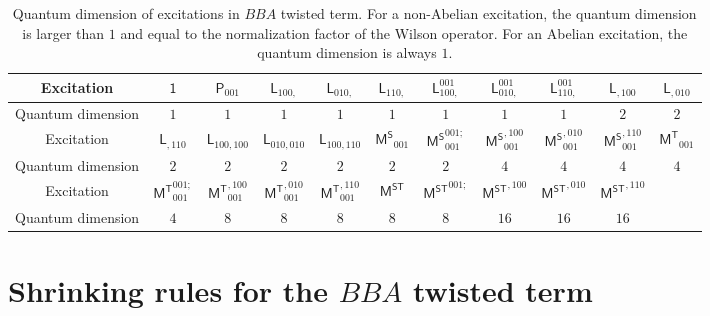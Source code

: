 \documentclass[11pt,nofootinbib,preprint]{revtex4-1}
\begin{document}
\begin{table}
	\caption{\label{table_quantumdBBA}Quantum dimension of excitations in $BBA$ twisted term. For a non-Abelian excitation, the quantum dimension is larger than $1$ and equal to the normalization factor of the Wilson operator. For an Abelian excitation, the quantum dimension is always $1$.  }
	\centering
	\footnotesize
	\begin{tabular*}{\textwidth}{@{\extracolsep{\fill}}ccccccccccc}
		\toprule
		Excitation & $\mathsf{1}$ & $\mathsf{P}_{001}$ & $\mathsf{L}_{100,}$ & $\mathsf{L}_{010,}$ & $\mathsf{L}_{110,}$ & $\mathsf{L}_{100,}^{001}$ & $\mathsf{L}_{010,}^{001}$ & $\mathsf{L}_{110,}^{001}$ & $\mathsf{L}_{,100}$ & $\mathsf{L}_{,010}$ \\ 
		\hline
		Quantum dimension & $1$ & $1$ & $1$ & $1$ & $1$ & $1$ & $1$ & $1$ & $2$ & $2$ \\
		\toprule
		Excitation & $\mathsf{L}_{,110}$ & $\mathsf{L}_{100,100}$ & $\mathsf{L}_{010,010}$ & $\mathsf{L}_{100,110}$ & $\mathsf{M^S}_{001}$ & $\mathsf{M^S}_{001}^{001;}$ & $\mathsf{M^S}_{001}^{,100}$ & $\mathsf{M^S}_{001}^{,010}$ & $\mathsf{M^S}_{001}^{,110}$ & $\mathsf{M^T}_{001}$ \\
		\hline
		Quantum dimension &$2$&$2$&$2$&$2$&$2$&$2$&$4$&$4$&$4$&$4$ \\
		\toprule
		Excitation &$\mathsf{M^T}_{001}^{001;}$ & $\mathsf{M^T}_{001}^{,100}$ & $\mathsf{M^T}_{001}^{,010}$ & $\mathsf{M^T}_{001}^{,110}$ & $\mathsf{M^{ST}}$ & $\mathsf{M^{ST}}^{001;}$ & $\mathsf{M^{ST}}^{,100}$ & $\mathsf{M^{ST}}^{,010}$ & $\mathsf{M^{ST}}^{,110}$ & \\
		\hline
		Quantum dimension &$4$&$8$&$8$&$8$&$8$&$8$&$16$&$16$&$16$& \\
		\bottomrule
	\end{tabular*}
\end{table}


 
\section{Shrinking rules for the $BBA$ twisted term\label{s4}}
\end{document}
